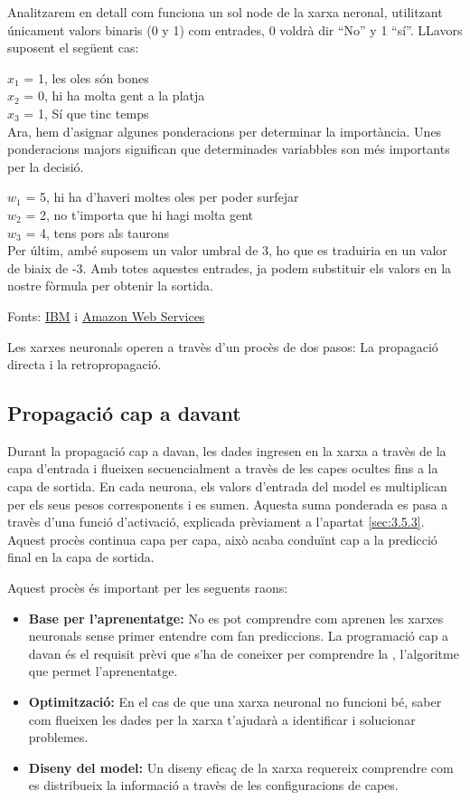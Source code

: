 Analitzarem en detall com funciona un sol node de la xarxa neronal, utilitzant únicament valors binaris (0 y 1) com entrades, 0 voldrà dir ``No'' y 1 ``sí''.
LLavors suposent el següent cas:

$x_1$ = 1, les oles són bones\\
$x_2$ = 0, hi ha molta gent a la platja\\
$x_3$ = 1, Sí que tinc temps\\

Ara, hem d'asignar algunes ponderacions per determinar la importància. Unes ponderacions majors significan que determinades variabbles son més importants per la decisió.

$w_1$ = 5, hi ha d'haveri moltes oles per poder surfejar\\
$w_2$ = 2, no t'importa que hi hagi molta gent\\
$w_3$ = 4, tens pors als taurons \\

Per últim, ambé suposem un valor umbral de 3, ho que es traduiria en un valor de biaix de -3. Amb totes aquestes entrades, ja podem substituir els valors en la nostre fòrmula per obtenir la sortida.

Fonts: \href{https://www.ibm.com/es-es/think/topics/neural-networks}{IBM} i \href{https://aws.amazon.com/es/what-is/neural-network/}{Amazon Web Services}

Les xarxes neuronals operen a travès d'un procès de dos pasos: La propagació directa i la retropropagació.

\subsection{Propagació cap a davant}\label{subsec:propagació}
Durant la propagació cap a davan, les dades ingresen en la xarxa a travès de la capa d'entrada i flueixen secuencialment a travès de les capes ocultes fins a la capa de sortida. En cada neurona, els valors d'entrada del model es multiplican per els seus pesos corresponents i es sumen. Aquesta suma ponderada es pasa a travès d'una funció d'activació, explicada prèviament a l'apartat \ref{sec:3.5.3}. Aquest procès continua capa per capa, això acaba conduïnt cap a la predicció final en la capa de sortida.

Aquest procès és important per les seguents raons:
\begin{itemize}
 \item \textbf{Base per l'aprenentatge:} No es pot comprendre com aprenen les xarxes neuronals sense primer entendre com fan prediccions. La programació cap a davan és el requisit prèvi que s'ha de coneixer per comprendre la , l'algoritme que permet l'aprenentatge.
 \item \textbf{Optimització:} En el cas de que una xarxa neuronal no funcioni bé, saber com flueixen les dades per la xarxa t'ajudarà a identificar i solucionar problemes.
 \item \textbf{Diseny del model:} Un diseny eficaç de la xarxa requereix comprendre com es distribueix la informació a travès de les configuracions de capes.
\end{itemize}

